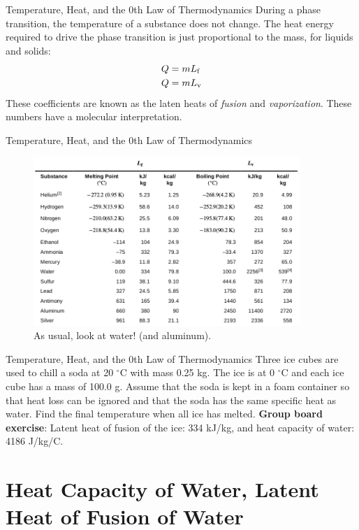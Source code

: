 \documentclass{beamer}
\begin{document}
\begin{frame}{Temperature, Heat, and the 0th Law of Thermodynamics}
\small
During a phase transition, the temperature of a substance does not change.  The heat energy required to drive the phase transition is just proportional to the mass, for liquids and solids:
\begin{align}
Q &= m L_{\rm f} \\
Q &= m L_{\rm v}
\end{align}
These coefficients are known as the laten heats of \textit{fusion} and \textit{vaporization}.  These numbers have a molecular interpretation.
\end{frame}

\begin{frame}{Temperature, Heat, and the 0th Law of Thermodynamics}
\begin{figure}
\centering
\includegraphics[width=0.9\textwidth]{figures/lvlf.png}
\caption{\label{fig:lvlf} As usual, look at water! (and aluminum).}
\end{figure}
\end{frame}

\begin{frame}{Temperature, Heat, and the 0th Law of Thermodynamics}
Three ice cubes are used to chill a soda at 20 $^\circ$C with mass 0.25 kg. The ice is at 0 $^\circ$C and each ice cube has a mass of 100.0 g. Assume that the soda is kept in a foam container so that heat loss can be ignored and that the soda has the same specific heat as water. Find the final temperature when all ice has melted.
\textbf{Group board exercise}: Latent heat of fusion of the ice: 334 kJ/kg, and heat capacity of water: 4186 J/kg/C.
\end{frame}

\section{Heat Capacity of Water, Latent Heat of Fusion of Water}
\end{document}
